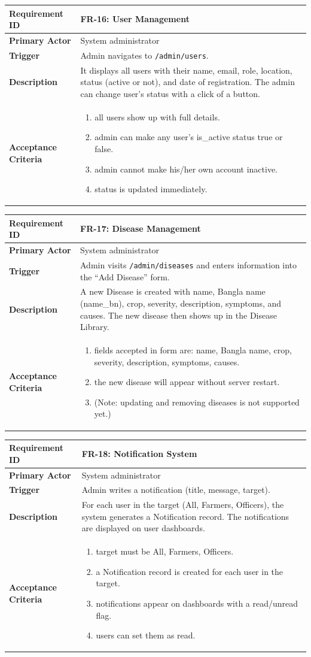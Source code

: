 \documentclass[12pt,a4paper]{article}
\newcommand{\frbox}[5]{%
  \begin{table}[H]
  \centering
  \begin{tabularx}{\textwidth}{|l|X|}
  \hline
  \rowcolor{lightgreen}
  \textbf{Requirement ID} & \textbf{#1} \\
  \hline
  \textbf{Primary Actor} & #2 \\
  \hline
  \textbf{Trigger} & #3 \\
  \hline
  \textbf{Description} & #4 \\
  \hline
  \rowcolor{lightgreen}
  \textbf{Acceptance Criteria} & #5 \\
  \hline
  \end{tabularx}
  \end{table}
}
\begin{document}
\frbox{FR-16: User Management}
{System administrator}
{Admin navigates to \texttt{/admin/users}.}
{It displays all users with their name, email, role, location, status (active or not), and date of registration. The admin can change user’s status with a click of a button.}
{%
\begin{enumerate}[leftmargin=1.5em, topsep=0pt]
  \item all users show up with full details.
  \item admin can make any user's is_active status true or false.
  \item admin cannot make his/her own account inactive.
  \item status is updated immediately.
\end{enumerate}
}

\frbox{FR-17: Disease Management}
{System administrator}
{Admin visits \texttt{/admin/diseases} and enters information into the ``Add Disease'' form.}
{A new Disease is created with name, Bangla name (name\_bn), crop, severity, description, symptoms, and causes. The new disease then shows up in the Disease Library.}
{%
\begin{enumerate}[leftmargin=1.5em, topsep=0pt]
  \item fields accepted in form are: name, Bangla name, crop, severity, description, symptoms, causes.
  \item the new disease will appear without server restart.
  \item (Note: updating and removing diseases is not supported yet.)
\end{enumerate}
}

\frbox{FR-18: Notification System}
{System administrator}
{Admin writes a notification (title, message, target).}
{For each user in the target (All, Farmers, Officers), the system generates a Notification record. The notifications are displayed on user dashboards.}
{%
\begin{enumerate}[leftmargin=1.5em, topsep=0pt]
  \item target must be All, Farmers, Officers.
  \item a Notification record is created for each user in the target.
  \item notifications appear on dashboards with a read/unread flag.
  \item users can set them as read.
\end{enumerate}
}


\end{document}
